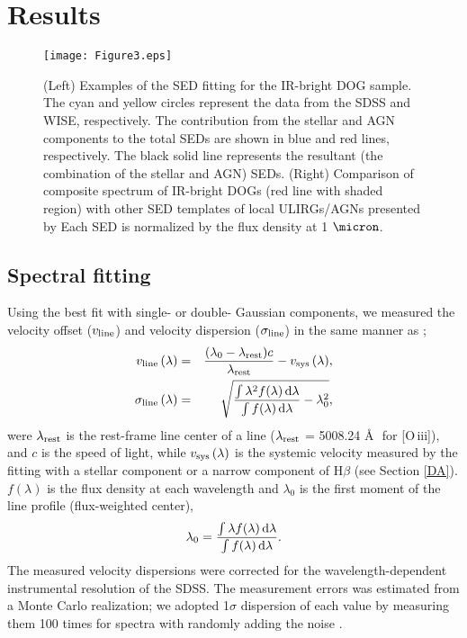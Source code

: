 \documentclass[twocolumn]{aastex6}
\begin{document}
   
\section{Results}
\label{Rs}
   \begin{figure*}
   \centering
   \texttt{[image: Figure3.eps]}
   \caption{(Left) Examples of the SED fitting for the IR-bright DOG sample. The cyan and yellow circles represent the data from the SDSS and WISE, respectively. The contribution from the stellar and AGN components to the total SEDs are shown in blue and red lines, respectively. The black solid line represents the resultant (the combination of the stellar and AGN) SEDs. (Right) Comparison of composite spectrum of IR-bright DOGs (red line with shaded region) with other SED templates of local ULIRGs/AGNs presented by \cite{Polletta} Each SED is normalized by the flux density at 1 $\micron$.}
   \label{SED}
   \end{figure*}  
\subsection{Spectral fitting}
\label{Spfit}
Using the best fit with single- or double- Gaussian components, we measured the velocity offset ($v_{\rm line}$) and velocity dispersion ($\sigma_{\rm line}$) in the same manner as \cite{Woo};
\begin{eqnarray}
v_{\rm line} \, (\lambda)  & = & \frac{(\lambda_0 - \lambda_{\rm rest})c}{\lambda_{\rm rest}}  - v_{\rm sys} \, (\lambda), \\
\sigma_{\rm line} \, (\lambda) & = & \sqrt{\frac{\int \lambda^2 f(\lambda) \,{\rm d}\lambda}{\int f(\lambda) \,{\rm d}\lambda} - \lambda_0^2},
\end{eqnarray}
were  $\lambda_{\rm rest}$ is the rest-frame line center of a line ($\lambda_{\rm rest}$  = 5008.24 \AA \,\, for [O{\,\sc iii}]), and $c$ is the speed of light, while $v_{\rm sys} \, (\lambda)$ is the systemic velocity measured by the fitting with a stellar component or a narrow component of H$\beta$ (see Section \ref{DA}).
$f(\lambda)$ is the flux density at each wavelength and $\lambda_0$ is the first moment of the line profile (flux-weighted center),
\begin{equation}
\lambda_0   =  \frac{\int \lambda f(\lambda) \,{\rm d}\lambda}{\int f(\lambda) \,{\rm d}\lambda}.
\end{equation}
The measured velocity dispersions were corrected for the wavelength-dependent instrumental resolution of the SDSS.
The measurement errors was estimated from a Monte Carlo realization; we adopted 1$\sigma$ dispersion of each value by measuring them 100 times for spectra with randomly adding the noise \citep[see][in detail]{Woo}.
\end{document}
